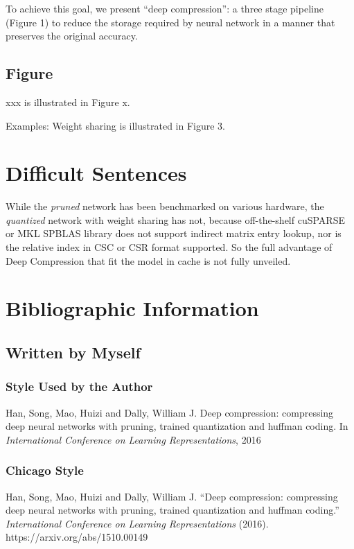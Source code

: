 \documentclass{article} %
\begin{document}
To achieve this goal, we present “deep compression”: a three stage pipeline (Figure 1) 
to reduce the storage required by neural network in a manner that preserves the 
original accuracy.

\subsection{Figure}

xxx is illustrated in Figure x.

Examples: Weight sharing is illustrated in Figure 3.

\section{Difficult Sentences}

While the \emph{pruned} network has been benchmarked on various hardware, 
the \emph{quantized} network with weight sharing has not, because off-the-shelf 
cuSPARSE or MKL SPBLAS library does not support indirect matrix entry lookup, nor is 
the relative index in CSC or CSR format supported. So the full
advantage of Deep Compression that fit the model in cache is not fully unveiled. 

\section{Bibliographic Information}

\subsection{Written by Myself}

\subsubsection{Style Used by the Author}
Han, Song, Mao, Huizi and Dally, William J. Deep compression: compressing 
deep neural networks with pruning, trained quantization and huffman coding. 
In \emph{International Conference on Learning Representations}, 2016

\subsubsection{Chicago Style}
Han, Song, Mao, Huizi and Dally, William J. ``Deep compression: compressing 
deep neural networks with pruning, trained quantization and huffman coding.'' 
\emph{International Conference on Learning Representations} (2016). https://arxiv.org/abs/1510.00149
\end{document}
